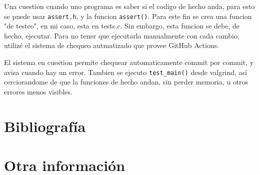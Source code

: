 \documentclass{article}
\begin{document}
	Una cuestion cuando uno programa es saber si el codigo de hecho anda, para esto se puede usar \verb|assert.h|, y la funcion \verb|assert()|. Para este fin se crea una funcion "de testeo", en mi caso, esta en tests.c. Sin embargo, esta funcion se debe, de hecho, ejecutar. Para no tener que ejecutarla manualmente con cada cambio, utilizé el sistema de chequeo autmatizado que provee GitHub Actions. 
	
	El sistema en cuestion permite chequear automaticamente commit por commit, y avisa cuando hay un error. Tambien se ejecuto \verb|test_main()| desde valgrind, así cerciorandome de que la funciones de hecho andan, sin perder memoria, u 
	otros errores menos visibles.

	\section*{Bibliografía}
	
	\nocite{*}
	\printbibliography[heading=none]
	
	
	\section*{Otra información}
	
	
\end{document}
